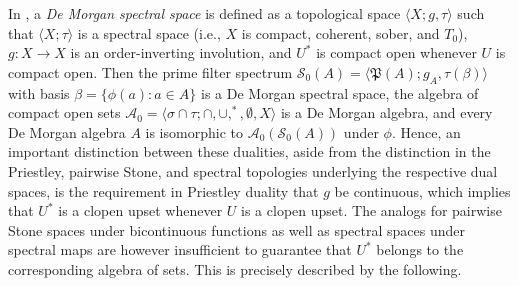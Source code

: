 \documentclass{amsart}
\theoremstyle{plain}
\theoremstyle{definition}
\begin{document}
In \cite{mcdonald}, a \emph{De Morgan spectral space} is defined as a topological space $\langle X;g,\tau\rangle$ such that $\langle X;\tau\rangle$ is a spectral space (i.e., $X$ is compact, coherent, sober, and $T_0$), $g\colon X\to X$ is an order-inverting involution, and $U^*$ is compact open whenever $U$ is compact open. Then the prime filter spectrum $\mathcal{S}_0(A)=\langle\mathfrak{P}(A);g_A,\tau(\beta)\rangle$ with basis $\beta=\{\phi(a) : a \in A\}$ is a De Morgan spectral space, the algebra of compact open sets $\mathcal{A}_0=\langle\sigma\cap\tau;\cap,\cup,^*,\emptyset,X\rangle$ is a De Morgan algebra, and every De Morgan algebra $A$ is isomorphic to $\mathcal{A}_0(\mathcal{S}_0(A))$ under $\phi$. Hence, an important distinction between these dualities, aside from the distinction in the Priestley, pairwise Stone, and spectral topologies underlying the respective dual spaces, is the requirement in Priestley duality that $g$ be continuous, which implies that $U^*$ is a clopen upset whenever $U$ is a clopen upset. The analogs for pairwise Stone spaces under bicontinuous functions as well as spectral spaces under spectral maps are however insufficient to guarantee that $U^*$ belongs to the corresponding algebra of sets. This is precisely described by the following.           
\end{document}
